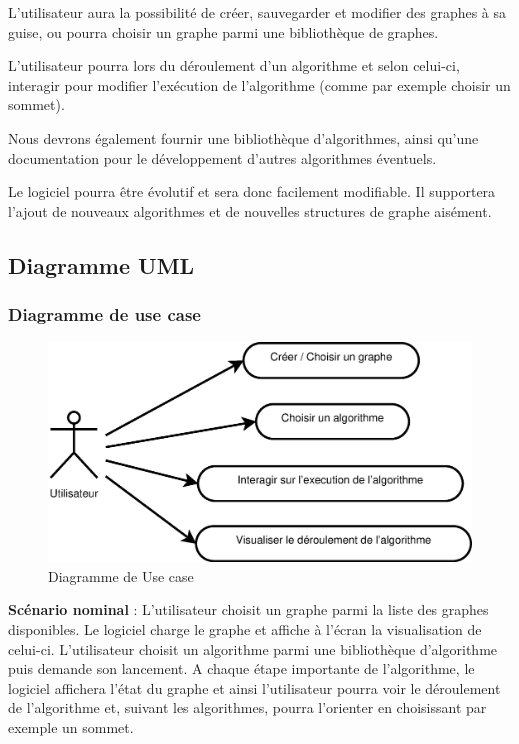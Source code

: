 \documentclass[11pt,a4paper]{article}
\begin{document}
		    L'utilisateur aura la possibilité de créer, sauvegarder et modifier des graphes à sa guise, ou pourra choisir un graphe parmi une bibliothèque de graphes. 
		    
		    L'utilisateur pourra lors du déroulement d'un algorithme et selon celui-ci, interagir pour modifier l'exécution de l'algorithme (comme par exemple choisir un sommet). 
		    
		    Nous devrons également fournir une bibliothèque d'algorithmes, ainsi qu'une documentation pour le développement d'autres algorithmes éventuels.
		    
		    Le logiciel pourra être évolutif et sera donc facilement modifiable. Il supportera l'ajout de nouveaux algorithmes et de nouvelles structures de graphe aisément.

		\subsection{Diagramme UML}
			
			\subsubsection{Diagramme de use case}
				\begin{figure}[htbp]
					\begin{center}
						\includegraphics[scale=0.4]{useCase.eps}
					\end{center}
					\caption{Diagramme de Use case}
					\label{img_use_case}
				\end{figure}
				\textbf{Scénario nominal }: L'utilisateur choisit un graphe parmi la liste des graphes disponibles. Le logiciel charge le graphe et affiche à l'écran la visualisation de celui-ci. L'utilisateur choisit un algorithme parmi une bibliothèque d'algorithme puis demande son lancement. A chaque étape importante de l'algorithme, le logiciel affichera l'état du graphe et ainsi l'utilisateur pourra voir le déroulement de l'algorithme et, suivant les algorithmes, pourra l'orienter en choisissant par exemple un sommet.
\end{document}
